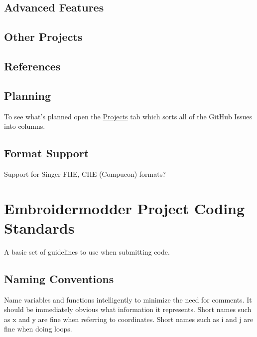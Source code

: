 \documentclass[a4paper, 11pt]{report}
\begin{document}
\hypertarget{advanced-features-1}{%
\subsection{Advanced Features}\label{advanced-features-1}}

\hypertarget{other-projects-1}{%
\subsection{Other Projects}\label{other-projects-1}}

\hypertarget{references-1}{%
\subsection{References}\label{references-1}}

\hypertarget{planning}{%
\subsection{Planning}\label{planning}}

To see what's planned open the
\href{https://github.com/Embroidermodder/Embroidermodder/projects/1}{Projects}
tab which sorts all of the GitHub Issues into columns.

\hypertarget{format-support}{%
\subsection{Format Support}\label{format-support}}

Support for Singer FHE, CHE (Compucon) formats?

\hypertarget{embroidermodder-project-coding-standards}{%
\section{Embroidermodder Project Coding
Standards}\label{embroidermodder-project-coding-standards}}

A basic set of guidelines to use when submitting code.

\hypertarget{naming-conventions}{%
\subsection{Naming Conventions}\label{naming-conventions}}

Name variables and functions intelligently to minimize the need for
comments. It should be immediately obvious what information it
represents. Short names such as x and y are fine when referring to
coordinates. Short names such as i and j are fine when doing loops.
\end{document}
